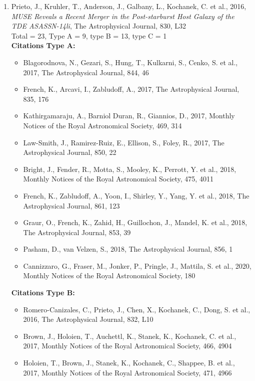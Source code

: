 \documentclass{letter}
\begin{document}
\begin{enumerate}
\begin{itemize}
\end{itemize}
\item Prieto, J., Kruhler, T., Anderson, J., Galbany, L., Kochanek, C. et al., 2016, {\it MUSE Reveals a Recent Merger in the Post-starburst Host Galaxy of the TDE ASASSN-14li}, The Astrophysical Journal, 830, L32 \\ 
Total = 23, Type A = 9, type B = 13, type C = 1 \\ 
{\bf Citations Type A:}
\begin{itemize}
\item Blagorodnova, N., Gezari, S., Hung, T., Kulkarni, S., Cenko, S. et al., 2017, The Astrophysical Journal, 844, 46
\item French, K., Arcavi, I., Zabludoff, A., 2017, The Astrophysical Journal, 835, 176
\item Kathirgamaraju, A., Barniol Duran, R., Giannios, D., 2017, Monthly Notices of the Royal Astronomical Society, 469, 314
\item Law-Smith, J., Ramirez-Ruiz, E., Ellison, S., Foley, R., 2017, The Astrophysical Journal, 850, 22
\item Bright, J., Fender, R., Motta, S., Mooley, K., Perrott, Y. et al., 2018, Monthly Notices of the Royal Astronomical Society, 475, 4011
\item French, K., Zabludoff, A., Yoon, I., Shirley, Y., Yang, Y. et al., 2018, The Astrophysical Journal, 861, 123
\item Graur, O., French, K., Zahid, H., Guillochon, J., Mandel, K. et al., 2018, The Astrophysical Journal, 853, 39
\item Pasham, D., van Velzen, S., 2018, The Astrophysical Journal, 856, 1
\item Cannizzaro, G., Fraser, M., Jonker, P., Pringle, J., Mattila, S. et al., 2020, Monthly Notices of the Royal Astronomical Society, 180
\end{itemize}
{\bf Citations Type B:}
\begin{itemize}
\item Romero-Canizales, C., Prieto, J., Chen, X., Kochanek, C., Dong, S. et al., 2016, The Astrophysical Journal, 832, L10
\item Brown, J., Holoien, T., Auchettl, K., Stanek, K., Kochanek, C. et al., 2017, Monthly Notices of the Royal Astronomical Society, 466, 4904
\item Holoien, T., Brown, J., Stanek, K., Kochanek, C., Shappee, B. et al., 2017, Monthly Notices of the Royal Astronomical Society, 471, 4966

\end{itemize}
\end{enumerate}
\end{document}
